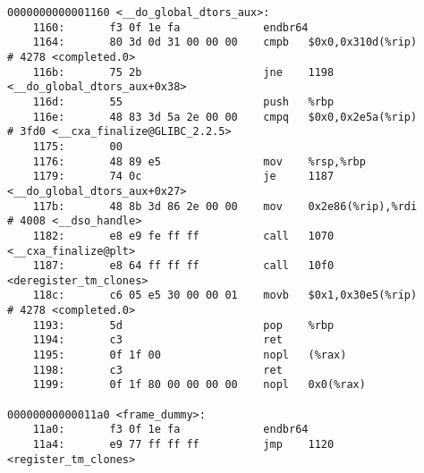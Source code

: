 \documentclass[UTF8,a4paper,10pt]{ctexart}
\begin{document}
\begin{lstlisting}[title=链接前后汇编代码对比,frame=trbl]
0000000000001160 <__do_global_dtors_aux>:
    1160:       f3 0f 1e fa             endbr64
    1164:       80 3d 0d 31 00 00 00    cmpb   $0x0,0x310d(%rip)        # 4278 <completed.0>
    116b:       75 2b                   jne    1198 <__do_global_dtors_aux+0x38>
    116d:       55                      push   %rbp
    116e:       48 83 3d 5a 2e 00 00    cmpq   $0x0,0x2e5a(%rip)        # 3fd0 <__cxa_finalize@GLIBC_2.2.5>
    1175:       00 
    1176:       48 89 e5                mov    %rsp,%rbp
    1179:       74 0c                   je     1187 <__do_global_dtors_aux+0x27>
    117b:       48 8b 3d 86 2e 00 00    mov    0x2e86(%rip),%rdi        # 4008 <__dso_handle>
    1182:       e8 e9 fe ff ff          call   1070 <__cxa_finalize@plt>
    1187:       e8 64 ff ff ff          call   10f0 <deregister_tm_clones>
    118c:       c6 05 e5 30 00 00 01    movb   $0x1,0x30e5(%rip)        # 4278 <completed.0>
    1193:       5d                      pop    %rbp
    1194:       c3                      ret
    1195:       0f 1f 00                nopl   (%rax)
    1198:       c3                      ret
    1199:       0f 1f 80 00 00 00 00    nopl   0x0(%rax)

00000000000011a0 <frame_dummy>:
    11a0:       f3 0f 1e fa             endbr64
    11a4:       e9 77 ff ff ff          jmp    1120 <register_tm_clones>


\end{lstlisting}
\end{document}
